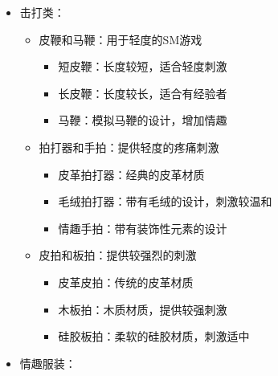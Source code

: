 \documentclass[12pt,UTF8]{ctexbook}
\begin{document}
\begin{itemize}
\begin{itemize}
\begin{itemize}
			\item 眼罩和耳塞：剥夺视觉和听觉，增强其他感官的敏感度
			\begin{itemize}
				\item 丝绸眼罩：柔软的丝绸材质，舒适度高
				\item 毛绒眼罩：带有毛绒的设计，增加温馨感
				\item 隔音耳塞：有效降低外界声音干扰
				\item 情趣眼罩：带有装饰性元素的设计
			\end{itemize}
			\item 口球和口塞：限制言语能力，增加支配服从的快感
			\begin{itemize}
				\item 硅胶口球：柔软的硅胶材质，舒适度高
				\item 皮革口塞：传统的皮革材质
				\item 透气型口塞：带有透气孔的设计，增加安全性
			\end{itemize}
		\end{itemize}
		\item 击打类：
		\begin{itemize}
			\item 皮鞭和马鞭：用于轻度的SM游戏
			\begin{itemize}
				\item 短皮鞭：长度较短，适合轻度刺激
				\item 长皮鞭：长度较长，适合有经验者
				\item 马鞭：模拟马鞭的设计，增加情趣
			\end{itemize}
			\item 拍打器和手拍：提供轻度的疼痛刺激
			\begin{itemize}
				\item 皮革拍打器：经典的皮革材质
				\item 毛绒拍打器：带有毛绒的设计，刺激较温和
				\item 情趣手拍：带有装饰性元素的设计
			\end{itemize}
			\item 皮拍和板拍：提供较强烈的刺激
			\begin{itemize}
				\item 皮革皮拍：传统的皮革材质
				\item 木板拍：木质材质，提供较强刺激
				\item 硅胶板拍：柔软的硅胶材质，刺激适中
			\end{itemize}
		\end{itemize}
		\item 情趣服装：

\end{itemize}
\end{itemize}
\end{document}
